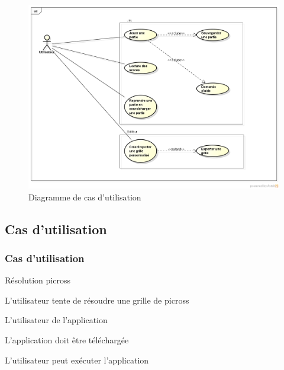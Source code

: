 \documentclass[a4paper, 12pt, twoside]{article}
\begin{document}
\begin{figure}[!ht]
  \center
  \includegraphics[scale=0.43]{CasUt.png}
  \caption{Diagramme de cas d'utilisation}
  \label{diagCU}
\end{figure}

\subsection{Cas d'utilisation}

\subsubsection*{Cas d'utilisation }

\begin{description}\setlength{\itemsep}{0mm}

 \item[Nom :] Résolution picross  
 \item[Description :] L’utilisateur tente de résoudre une grille de picross 
 \item[Acteur :] L'utilisateur de l'application 
 \item[Préalables :]  L'application doit être téléchargée
 \item[Conséquents :] L'utilisateur peut exécuter l'application\newline
 
\end{description}
\end{document}
